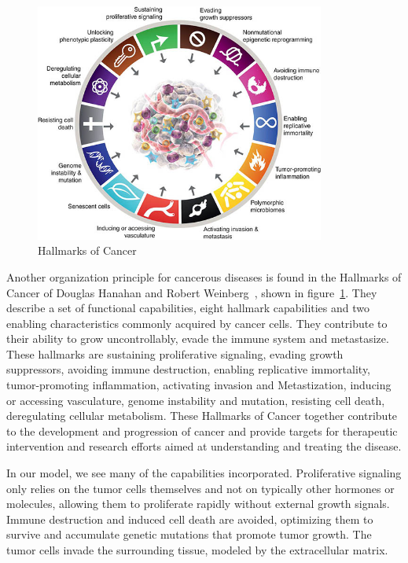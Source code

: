 \begin{figure}[h]
    \centering
    \includegraphics[width=0.85\textwidth]{resources/images/Hallmarks-of-Cancer.jpg}
    \caption{Hallmarks of Cancer}
    \label{fig:hallmarks_of_cancer}
\end{figure}
Another organization principle for cancerous diseases is found in the Hallmarks of Cancer of Douglas Hanahan and Robert Weinberg~\cite{10.1158/2159-8290.CD-21-1059}, shown in figure~\ref{fig:hallmarks_of_cancer}. They describe a set of functional capabilities, eight hallmark capabilities and two enabling characteristics commonly acquired by cancer cells. They contribute to their ability to grow uncontrollably, evade the immune system and metastasize. These hallmarks are sustaining proliferative signaling, evading growth suppressors, avoiding immune destruction, enabling replicative immortality, tumor-promoting inflammation, activating invasion and Metastization, inducing or accessing vasculature, genome instability and mutation, resisting cell death, deregulating cellular metabolism. These Hallmarks of Cancer together contribute to the development and progression of cancer and provide targets for therapeutic intervention and research efforts aimed at understanding and treating the disease. 

In our model, we see many of the capabilities incorporated. Proliferative signaling only relies on the tumor cells themselves and not on typically other hormones or molecules, allowing them to proliferate rapidly without external growth signals. Immune destruction and induced cell death are avoided, optimizing them to survive and accumulate genetic mutations that promote tumor growth. The tumor cells invade the surrounding tissue, modeled by the extracellular matrix.

